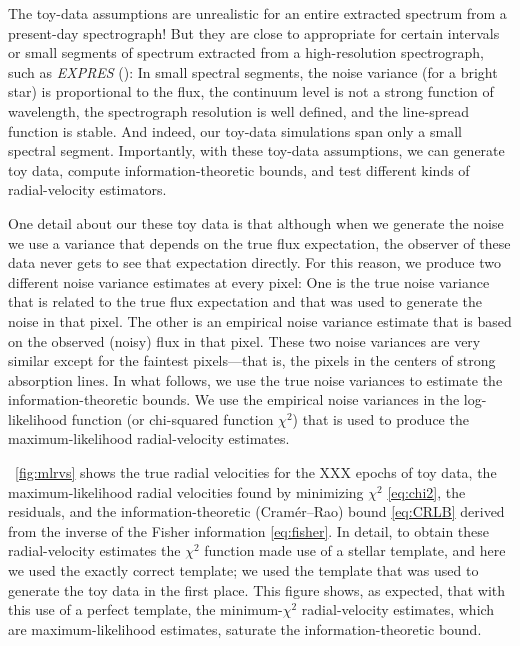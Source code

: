 \documentclass[modern]{aastex631}
\newcommand{\project}[1]{\textsl{#1}}
\newcommand{\figref}[1]{\figurename~\ref{#1}}
\begin{document}
The toy-data assumptions are unrealistic for an entire extracted spectrum from a present-day spectrograph!
But they are close to appropriate for certain intervals or small segments of spectrum extracted from a high-resolution spectrograph, such as \project{EXPRES} (\citealt{express}):
In small spectral segments, the noise variance (for a bright star) is proportional to the flux, the continuum level is not a strong function of wavelength, the spectrograph resolution is well defined, and the line-spread function is stable.
And indeed, our toy-data simulations span only a small spectral segment.
Importantly, with these toy-data assumptions, we can generate toy data, compute information-theoretic bounds, and test different kinds of radial-velocity estimators.

One detail about our these toy data is that although when we generate the noise we use a variance that depends on the true flux expectation, the observer of these data never gets to see that expectation directly.
For this reason, we produce two different noise variance estimates at every pixel:
One is the true noise variance that is related to the true flux expectation and that was used to generate the noise in that pixel.
The other is an empirical noise variance estimate that is based on the observed (noisy) flux in that pixel.
These two noise variances are very similar except for the faintest pixels---that is, the pixels in the centers of strong absorption lines.
In what follows, we use the true noise variances to estimate the information-theoretic bounds.
We use the empirical noise variances in the log-likelihood function (or chi-squared function $\chi^2$) that is used to produce the maximum-likelihood radial-velocity estimates.

\figref{fig:mlrvs} shows the true radial velocities for the XXX epochs of toy data, the maximum-likelihood radial velocities found by minimizing $\chi^2$ \eqref{eq:chi2}, the residuals, and the information-theoretic (Cram\'er--Rao) bound \eqref{eq:CRLB} derived from the inverse of the Fisher information \eqref{eq:fisher}.
In detail, to obtain these radial-velocity estimates the $\chi^2$ function made use of a stellar template, and here we used the exactly correct template; we used the template that was used to generate the toy data in the first place.
This figure shows, as expected, that with this use of a perfect template, the minimum-$\chi^2$ radial-velocity estimates, which are maximum-likelihood estimates, saturate the information-theoretic bound.
\end{document}
